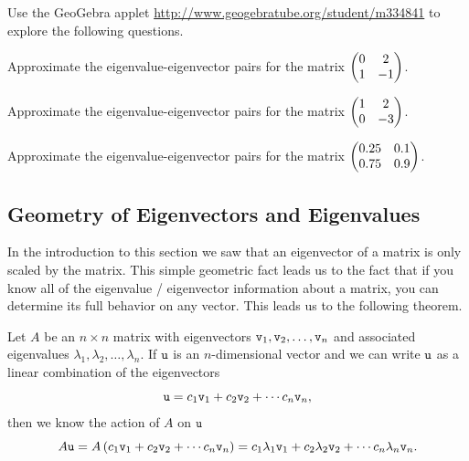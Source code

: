 % 
\begin{problem}
    Use the GeoGebra applet
    \href{http://www.geogebratube.org/student/m334841}{http://www.geogebratube.org/student/m334841}
    to explore the following questions.
    \ba
        \item Approximate the eigenvalue-eigenvector pairs for the matrix $\begin{pmatrix} 0 & 2 \\ 1
            & -1 \end{pmatrix}$.
        \item Approximate the eigenvalue-eigenvector pairs for the matrix $\begin{pmatrix} 1 & 2 \\ 0
            & -3 \end{pmatrix}$.
        \item Approximate the eigenvalue-eigenvector pairs for the matrix $\begin{pmatrix} 0.25 & 0.1
            \\ 0.75 & 0.9 \end{pmatrix}$.
    \ea

\end{problem}

\subsection{Geometry of Eigenvectors and Eigenvalues}
In the introduction to this section we saw that an eigenvector of a matrix is only scaled
by the matrix.  This simple geometric fact leads us to the fact that if you know all of
the eigenvalue / eigenvector information about a matrix, you can determine its full
behavior on any vector.  This leads us to the following theorem.

\begin{thm}
    Let $A$ be an $n \times n$ matrix with eigenvectors $\texttt{v}_1, \texttt{v}_2, \dots, \texttt{v}_n$ and
    associated eigenvalues $\lambda_1, \lambda_2, \dots, \lambda_n$.  If $\texttt{u}$ is an
    $n$-dimensional vector and we can write $\texttt{u}$ as a linear combination of the
    eigenvectors 
    \[ \texttt{u} = c_1 \texttt{v}_1 + c_2 \texttt{v}_2 + \cdots c_n \texttt{v}_n, \]
    then we know the action of $A$ on $\texttt{u}$
    \[ A\texttt{u} = A\left(c_1 \texttt{v}_1 + c_2 \texttt{v}_2 + \cdots c_n \texttt{v}_n\right) = c_1 \lambda_1 \texttt{v}_1
        + c_2 \lambda_2 \texttt{v}_2 + \cdots c_n \lambda_n \texttt{v}_n. \]
    \label{thm:10.6.eig1}
\end{thm}

